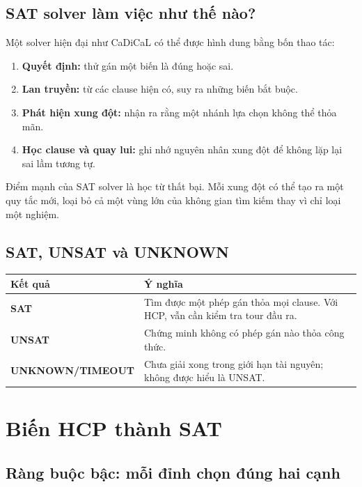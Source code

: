 \documentclass[11pt,a4paper,oneside]{scrreprt}
\begin{document}
\section{SAT solver làm việc như thế nào?}

Một solver hiện đại như CaDiCaL có thể được hình dung bằng bốn thao tác:

\begin{enumerate}
  \item \textbf{Quyết định:} thử gán một biến là đúng hoặc sai.
  \item \textbf{Lan truyền:} từ các clause hiện có, suy ra những biến bắt buộc.
  \item \textbf{Phát hiện xung đột:} nhận ra rằng một nhánh lựa chọn không thể thỏa mãn.
  \item \textbf{Học clause và quay lui:} ghi nhớ nguyên nhân xung đột để không lặp lại sai lầm tương tự.
\end{enumerate}

\begin{intuitionbox}
Điểm mạnh của SAT solver là học từ thất bại. Mỗi xung đột có thể tạo ra một quy tắc mới, loại bỏ cả một vùng lớn của không gian tìm kiếm thay vì chỉ loại một nghiệm.
\end{intuitionbox}

\section{SAT, UNSAT và UNKNOWN}

\begin{tabularx}{\textwidth}{>{\bfseries\sffamily}l X}
\toprule
Kết quả & Ý nghĩa \\
\midrule
SAT & Tìm được một phép gán thỏa mọi clause. Với HCP, vẫn cần kiểm tra tour đầu ra. \\
UNSAT & Chứng minh không có phép gán nào thỏa công thức. \\
UNKNOWN/TIMEOUT & Chưa giải xong trong giới hạn tài nguyên; không được hiểu là UNSAT. \\
\bottomrule
\end{tabularx}

\chapter{Biến HCP thành SAT}

\section{Ràng buộc bậc: mỗi đỉnh chọn đúng hai cạnh}
\end{document}
